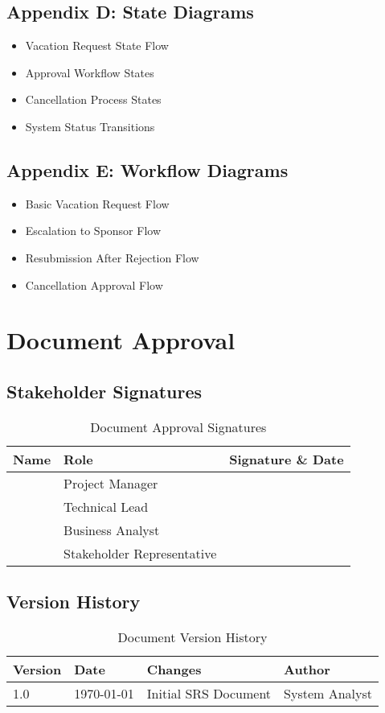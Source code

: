 \documentclass[12pt,a4paper]{article}
\begin{document}
\subsection{Appendix D: State Diagrams}
\begin{itemize}
    \item Vacation Request State Flow
    \item Approval Workflow States
    \item Cancellation Process States
    \item System Status Transitions
\end{itemize}

\subsection{Appendix E: Workflow Diagrams}
\begin{itemize}
    \item Basic Vacation Request Flow
    \item Escalation to Sponsor Flow
    \item Resubmission After Rejection Flow
    \item Cancellation Approval Flow
\end{itemize}

\section{Document Approval}

\subsection{Stakeholder Signatures}
\begin{table}[H]
\centering
\begin{tabular}{|p{4cm}|p{4cm}|p{4cm}|}
\hline
\textbf{Name} & \textbf{Role} & \textbf{Signature \& Date} \\
\hline
 & Project Manager &  \\
\hline
 & Technical Lead &  \\
\hline
 & Business Analyst &  \\
\hline
 & Stakeholder Representative &  \\
\hline
\end{tabular}
\caption{Document Approval Signatures}
\end{table}

\subsection{Version History}
\begin{table}[H]
\centering
\begin{tabular}{|p{2cm}|p{3cm}|p{4cm}|p{3cm}|}
\hline
\textbf{Version} & \textbf{Date} & \textbf{Changes} & \textbf{Author} \\
\hline
1.0 & \today & Initial SRS Document & System Analyst \\
\hline
\end{tabular}
\caption{Document Version History}
\end{table}
\end{document}
